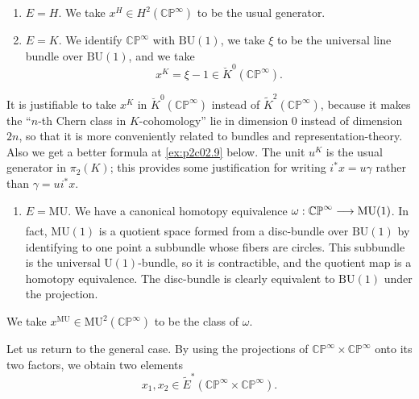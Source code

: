 \documentclass[../main]{subfiles}
\begin{document}
\begin{examples}
\begin{enumerate}
    \item[(2.2)] $E = H$. We take $x^H \in H^2(\mathbb {CP}^\infty)$ to be the usual generator.
    \item[(2.3)] $E = K$. We identify $\mathbb {CP}^\infty$ with $\mathrm{BU}(1)$, we take $\xi$ to be the universal line bundle over $\mathrm{BU}(1)$, and we take \[x^K = \xi - 1 \in {\breve K}^0(\mathbb {CP}^\infty).\] 
\end{enumerate}

\begin{notes}
It is justifiable to take $x^K$ in ${\breve K}^0(\mathbb {CP}^\infty)$ instead of ${\tilde K}^2(\mathbb {CP}^\infty)$, because it makes the ``$n$-th Chern class in $K$-cohomology'' lie in dimension 0 instead of dimension $2n$, so that it is more conveniently related to bundles and representation-theory. Also we get a better formula at \ref{ex:p2c02.9} below. The unit $u^K$ is the usual generator in $\pi_2(K)$; this provides some justification for writing $i^\ast x = u \gamma$ rather than $\gamma = u i^\ast x$.
\end{notes}
\end{examples}

\begin{enumerate}
    \item[(2.4)] $E = \mathrm{MU}$. We have a canonical homotopy equivalence $\omega : \mathbb {CP}^\infty \lar{} \mathrm{MU}(1)$. In fact, $\mathrm{MU}(1)$ is a quotient space formed from a disc-bundle over $\mathrm{BU}(1)$ by identifying to one point a subbundle whose fibers are circles. This subbundle is the universal $\mathrm{U}(1)$-bundle, so it is contractible, and the quotient map is a homotopy equivalence. The disc-bundle is clearly equivalent to $\mathrm{BU}(1)$ under the projection. 
\end{enumerate}

We take $x^{\mathrm{MU}} \in \mathrm {MU}^2(\mathbb {CP}^\infty)$ to be the class of $\omega$. 

Let us return to the general case. By using the projections of $\mathbb {CP}^\infty \times \mathbb {CP}^\infty$ onto its two factors, we obtain two elements \[x_1, x_2 \in {\tilde E}^\ast(\mathbb {CP}^\infty \times \mathbb {CP}^\infty).\]
\end{document}
